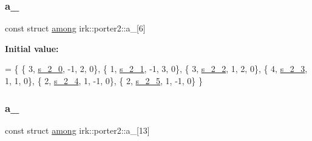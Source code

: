 \subsubsection{\texorpdfstring{a\+\_}{a\_2}}
{\footnotesize\ttfamily const struct \mbox{\hyperlink{structirk_1_1porter2_1_1among}{among}} irk\+::porter2\+::a\+\_\mbox{[}6\mbox{]}\hspace{0.3cm}{\ttfamily [static]}}

{\bfseries Initial value\+:}
\begin{DoxyCode}
=
\{
 \{ 3, \mbox{\hyperlink{namespaceirk_1_1porter2_a4287e89141dfb7d986d085f6697f4f21}{s\_2\_0}}, -1, 2, 0\},
 \{ 1, \mbox{\hyperlink{namespaceirk_1_1porter2_ab826ae82f45b1d1b65d472973f3f589b}{s\_2\_1}}, -1, 3, 0\},
 \{ 3, \mbox{\hyperlink{namespaceirk_1_1porter2_a26d566d7421df6563ca28dd5f368d20f}{s\_2\_2}}, 1, 2, 0\},
 \{ 4, \mbox{\hyperlink{namespaceirk_1_1porter2_ad869a0ba34d7978c8e8ed3561b6798d5}{s\_2\_3}}, 1, 1, 0\},
 \{ 2, \mbox{\hyperlink{namespaceirk_1_1porter2_af28b06a30f4f867b3546bf0ca8ddece6}{s\_2\_4}}, 1, -1, 0\},
 \{ 2, \mbox{\hyperlink{namespaceirk_1_1porter2_a06b96a69db6d2ffdd44f72a328d486c8}{s\_2\_5}}, 1, -1, 0\}
\}
\end{DoxyCode}
\mbox{\label{namespaceirk_1_1porter2_ac6329182a6bd61183f605ebce60bee19}} 
\subsubsection{\texorpdfstring{a\+\_}{a\_3}}
{\footnotesize\ttfamily const struct \mbox{\hyperlink{structirk_1_1porter2_1_1among}{among}} irk\+::porter2\+::a\+\_\mbox{[}13\mbox{]}\hspace{0.3cm}{\ttfamily [static]}}

